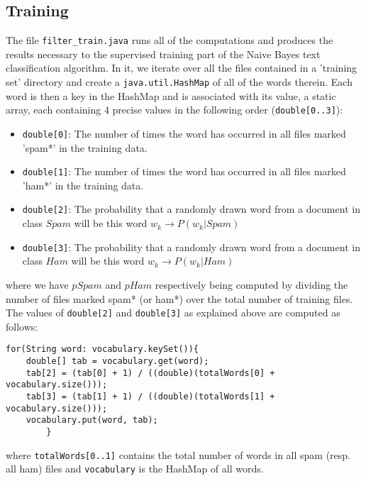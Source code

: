 \documentclass[12pt,a4paper]{report}
\begin{document}
\subsection{Training}
The file \texttt{filter\_train.java} runs all of the computations and produces the results necessary to the supervised training part of the Naive Bayes text classification algorithm. In it, we iterate over all the files contained in a 'training set' directory and create a \texttt{java.util.HashMap} of all of the words therein. Each word is then a key in the HashMap and is associated with its value, a static array, each containing 4 precise values in the following order (\texttt{double[0..3]}):
\begin{itemize}
\item \texttt{double[0]}: The number of times the word has occurred in all files marked 'spam*' in the training data.
\item \texttt{double[1]}: The number of times the word has occurred in all files marked 'ham*' in the training data.
\item \texttt{double[2]}: The probability that a randomly drawn word from a document in class $Spam$ will be this word $w_k \rightarrow P(w_k|Spam)$
\item \texttt{double[3]}: The probability that a randomly drawn word from a document in class $Ham$ will be this word $w_k \rightarrow P(w_k|Ham)$
\end{itemize} 
where we have $pSpam$ and $pHam$ respectively being computed by dividing the number of files marked spam* (or ham*) over the total number of training files. The values of \texttt{double[2]} and \texttt{double[3]} as explained above are computed as follows: 
\begin{lstlisting}
for(String word: vocabulary.keySet()){
	double[] tab = vocabulary.get(word);
	tab[2] = (tab[0] + 1) / ((double)(totalWords[0] + vocabulary.size()));
	tab[3] = (tab[1] + 1) / ((double)(totalWords[1] + vocabulary.size()));
	vocabulary.put(word, tab);
		}
\end{lstlisting}
where \texttt{totalWords[0..1]} contains the total number of words in all spam (resp. all ham) files and \texttt{vocabulary} is the HashMap of all words.
\end{document}
